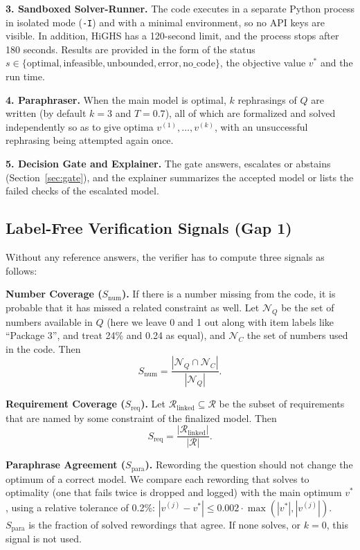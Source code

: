 \documentclass[conference]{IEEEtran}
\begin{document}
\textbf{3. Sandboxed Solver-Runner.} The code executes in a separate Python process in isolated mode (\texttt{-I}) and with a minimal environment, so no API keys are visible. In addition, HiGHS has a 120-second limit, and the process stops after 180 seconds. Results are provided in the form of the status $s \in \{\text{optimal}, \text{infeasible}, \text{unbounded}, \text{error}, \text{no\_code}\}$, the objective value $v^*$ and the run time.

\textbf{4. Paraphraser.} When the main model is optimal, $k$ rephrasings of $Q$ are written (by default $k = 3$ and
$T = 0.7$), all of which are formalized and solved independently so as to give optima $v^{(1)}, \dots, v^{(k)}$, with
an unsuccessful rephrasing being attempted again once.

\textbf{5. Decision Gate and Explainer.} The gate answers, escalates or abstains (Section~\ref{sec:gate}), and the
explainer summarizes the accepted model or lists the failed checks of the escalated model.

\subsection{Label-Free Verification Signals (Gap 1)}
Without any reference answers, the verifier has to compute three signals as follows:

\textbf{Number Coverage ($S_{\text{num}}$).} If there is a number missing from the code, it is probable that it has missed a related constraint as well. Let $\mathcal{N}_Q$ be the set of numbers available in $Q$ (here we leave 0 and 1 out along with item labels like ``Package 3'', and treat 24\% and 0.24 as equal), and $\mathcal{N}_C$ the set of numbers used in the code. Then
\begin{equation}
S_{\text{num}} = \frac{|\mathcal{N}_Q \cap \mathcal{N}_C|}{|\mathcal{N}_Q|}.
\end{equation}

\textbf{Requirement Coverage ($S_{\text{req}}$).} Let $\mathcal{R}_{\text{linked}} \subseteq \mathcal{R}$ be the subset of requirements that are named by some constraint of the finalized model. Then
\begin{equation}
S_{\text{req}} = \frac{|\mathcal{R}_{\text{linked}}|}{|\mathcal{R}|}.
\end{equation}

\textbf{Paraphrase Agreement ($S_{\text{para}}$).} Rewording the question should not change the optimum of a correct model. We compare each rewording that solves to optimality (one that fails twice is dropped and logged) with the main optimum $v^*$, using a relative tolerance of 0.2\%: $|v^{(j)} - v^*| \le 0.002 \cdot \max(|v^*|, |v^{(j)}|)$. $S_{\text{para}}$ is the fraction of solved rewordings that agree. If none solves, or $k = 0$, this signal is not used.
\end{document}
